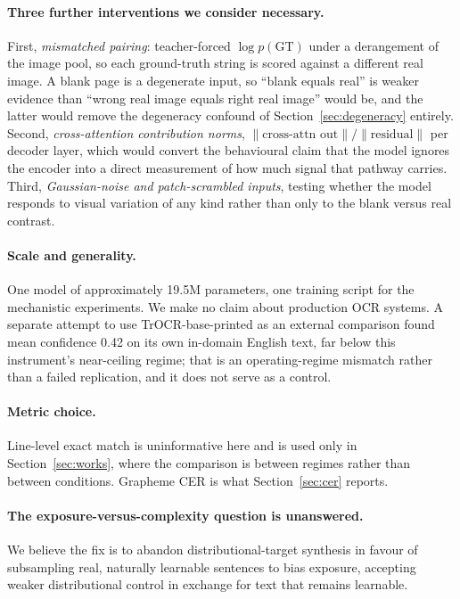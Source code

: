 \documentclass{article}
\begin{document}
\paragraph{Three further interventions we consider necessary.} First, \emph{mismatched
pairing}: teacher-forced $\log p(\mathrm{GT})$ under a derangement of the image pool, so each
ground-truth string is scored against a different real image. A blank page is a degenerate
input, so ``blank equals real'' is weaker evidence than ``wrong real image equals right real
image'' would be, and the latter would remove the degeneracy confound of
Section~\ref{sec:degeneracy} entirely. Second, \emph{cross-attention contribution norms},
$\|\text{cross-attn out}\|/\|\text{residual}\|$ per decoder layer, which would convert the
behavioural claim that the model ignores the encoder into a direct measurement of how much
signal that pathway carries. Third, \emph{Gaussian-noise and patch-scrambled inputs}, testing
whether the model responds to visual variation of any kind rather than only to the blank
versus real contrast.

\paragraph{Scale and generality.} One model of approximately 19.5M parameters, one training
script for the mechanistic experiments. We make no claim about production OCR systems. A
separate attempt to use TrOCR-base-printed as an external comparison found mean confidence
0.42 on its own in-domain English text, far below this instrument's near-ceiling regime; that
is an operating-regime mismatch rather than a failed replication, and it does not serve as a
control.

\paragraph{Metric choice.} Line-level exact match is uninformative here and is used only in
Section~\ref{sec:works}, where the comparison is between regimes rather than between
conditions. Grapheme CER is what Section~\ref{sec:cer} reports.

\paragraph{The exposure-versus-complexity question is unanswered.} We believe the fix is to
abandon distributional-target synthesis in favour of subsampling real, naturally learnable
sentences to bias exposure, accepting weaker distributional control in exchange for text that
remains learnable.
\end{document}
